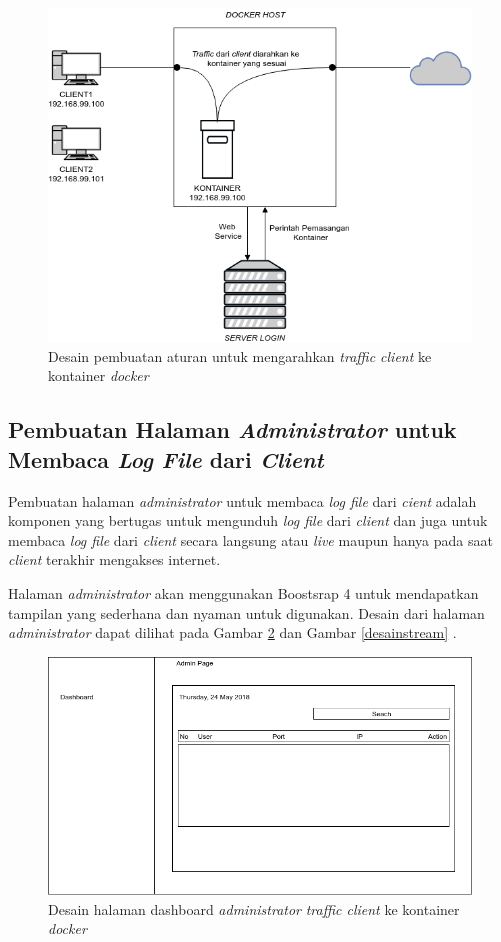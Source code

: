\begin{figure}[H]
	\centering
	\includegraphics[width=\linewidth]{images/bab3/DIAGRAM3}
	\caption{Desain pembuatan aturan untuk mengarahkan \textit{traffic client} ke kontainer \textit{docker}}
	\label{mengarahkankontainerdocker}
\end{figure}

\subsection{Pembuatan Halaman \textit{Administrator} untuk Membaca \textit{Log File} dari \textit{Client}}
Pembuatan halaman \textit{administrator} untuk membaca \textit{log file} dari \textit{cient} adalah komponen yang bertugas untuk mengunduh \textit{log file} dari \textit{client} dan juga untuk membaca \textit{log file} dari \textit{client} secara langsung atau \textit{live} maupun hanya pada saat \textit{client} terakhir mengakses internet.

Halaman \textit{administrator} akan menggunakan Boostsrap 4 untuk mendapatkan tampilan yang sederhana dan nyaman untuk digunakan. Desain dari halaman \textit{administrator} dapat dilihat pada Gambar \ref{desaindashboard} dan Gambar \ref{desainstream} .

\begin{figure}[H]
	\centering
	\includegraphics[width=\linewidth]{images/bab3/desaindashboard}
	\caption{Desain halaman dashboard \textit{administrator} \textit{traffic client} ke kontainer \textit{docker}}
	\label{desaindashboard}
\end{figure}

